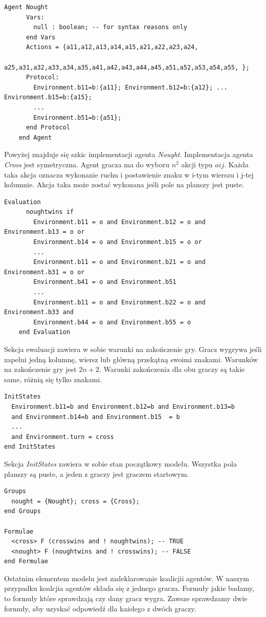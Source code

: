     \begin{lstlisting}[language={}]
    Agent Nought
      Vars:
        null : boolean; -- for syntax reasons only
      end Vars
      Actions = {a11,a12,a13,a14,a15,a21,a22,a23,a24,
                a25,a31,a32,a33,a34,a35,a41,a42,a43,a44,a45,a51,a52,a53,a54,a55, };
      Protocol: 
        Environment.b11=b:{a11}; Environment.b12=b:{a12}; ... Environment.b15=b:{a15};
        ...
        Environment.b51=b:{a51};
      end Protocol
    end Agent
    \end{lstlisting}
    Powyżej znajduje się szkic implementacji agenta \textit{Nought}. Implementacja agenta \textit{Cross} jest symetryczna.
    Agent gracza ma do wyboru $n^{2}$ akcji typu $aij$. Każda taka akcja oznacza wykonanie ruchu i postawienie znaku w i-tym wierszu i j-tej kolumnie.
    Akcja taka może zostać wykonana jeśli pole na planszy jest puste.
    \begin{lstlisting}[language={}]
    Evaluation
      noughtwins if
        Environment.b11 = o and Environment.b12 = o and Environment.b13 = o or
        Environment.b14 = o and Environment.b15 = o or 
        ...
        Environment.b11 = o and Environment.b21 = o and Environment.b31 = o or
        Environment.b41 = o and Environment.b51
        ... 
        Environment.b11 = o and Environment.b22 = o and Environment.b33 and 
        Environment.b44 = o and Environment.b55 = o 
    end Evaluation
    \end{lstlisting}
    Sekcja ewaluacji zawiera w sobie warunki na zakończenie gry. Gracz wygrywa jeśli zapełni jedną kolumnę, wiersz 
    lub główną przekątną swoimi znakami. Warunków na zakończenie gry jest $2n+2$. Warunki zakończenia dla obu graczy 
    są takie same, różnią się tylko znakami.
    \begin{lstlisting}[language={}]
        InitStates
  Environment.b11=b and Environment.b12=b and Environment.b13=b 
  and Environment.b14=b and Environment.b15  = b 
  ...
  and Environment.turn = cross
end InitStates
\end{lstlisting}
Sekcja \textit{InitStates} zawiera w sobie stan początkowy modelu. Wszystka pola planszy są puste, a jeden z graczy 
jest graczem startowym.

\begin{lstlisting}[language={}]
Groups
  nought = {Nought}; cross = {Cross};
end Groups

Formulae
  <cross> F (crosswins and ! noughtwins); -- TRUE
  <nought> F (noughtwins and ! crosswins); -- FALSE
end Formulae
\end{lstlisting}
Ostatnim elementem modelu jest zadeklarowanie koalicjii agentów. W naszym przypadku koalcjia agentów składa się z jednego gracza.
Formuły jakie badamy, to formuły które sprawdzają czy dany gracz wygra. Zawsze sprawdzamy dwie formuły, 
aby uzyskać odpowiedź dla każdego z dwóch graczy.
